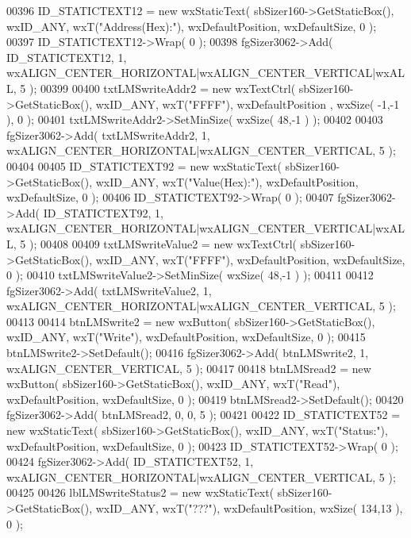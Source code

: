 \begin{DoxyCode}
00396     ID_STATICTEXT12 = \textcolor{keyword}{new} wxStaticText( sbSizer160->GetStaticBox(), wxID\_ANY, wxT(\textcolor{stringliteral}{"Address(Hex):"}), 
      wxDefaultPosition, wxDefaultSize, 0 );
00397     ID_STATICTEXT12->Wrap( 0 );
00398     fgSizer3062->Add( ID_STATICTEXT12, 1, wxALIGN\_CENTER\_HORIZONTAL|wxALIGN\_CENTER\_VERTICAL|wxALL, 5 );
00399     
00400     txtLMSwriteAddr2 = \textcolor{keyword}{new} wxTextCtrl( sbSizer160->GetStaticBox(), wxID\_ANY, wxT(\textcolor{stringliteral}{"FFFF"}), wxDefaultPosition
      , wxSize( -1,-1 ), 0 );
00401     txtLMSwriteAddr2->SetMinSize( wxSize( 48,-1 ) );
00402     
00403     fgSizer3062->Add( txtLMSwriteAddr2, 1, wxALIGN\_CENTER\_HORIZONTAL|wxALIGN\_CENTER\_VERTICAL, 5 );
00404     
00405     ID_STATICTEXT92 = \textcolor{keyword}{new} wxStaticText( sbSizer160->GetStaticBox(), wxID\_ANY, wxT(\textcolor{stringliteral}{"Value(Hex):"}), 
      wxDefaultPosition, wxDefaultSize, 0 );
00406     ID_STATICTEXT92->Wrap( 0 );
00407     fgSizer3062->Add( ID_STATICTEXT92, 1, wxALIGN\_CENTER\_HORIZONTAL|wxALIGN\_CENTER\_VERTICAL|wxALL, 5 );
00408     
00409     txtLMSwriteValue2 = \textcolor{keyword}{new} wxTextCtrl( sbSizer160->GetStaticBox(), wxID\_ANY, wxT(\textcolor{stringliteral}{"FFFF"}), 
      wxDefaultPosition, wxDefaultSize, 0 );
00410     txtLMSwriteValue2->SetMinSize( wxSize( 48,-1 ) );
00411     
00412     fgSizer3062->Add( txtLMSwriteValue2, 1, wxALIGN\_CENTER\_HORIZONTAL|wxALIGN\_CENTER\_VERTICAL, 5 );
00413     
00414     btnLMSwrite2 = \textcolor{keyword}{new} wxButton( sbSizer160->GetStaticBox(), wxID\_ANY, wxT(\textcolor{stringliteral}{"Write"}), wxDefaultPosition, 
      wxDefaultSize, 0 );
00415     btnLMSwrite2->SetDefault(); 
00416     fgSizer3062->Add( btnLMSwrite2, 1, wxALIGN\_CENTER\_VERTICAL, 5 );
00417     
00418     btnLMSread2 = \textcolor{keyword}{new} wxButton( sbSizer160->GetStaticBox(), wxID\_ANY, wxT(\textcolor{stringliteral}{"Read"}), wxDefaultPosition, 
      wxDefaultSize, 0 );
00419     btnLMSread2->SetDefault(); 
00420     fgSizer3062->Add( btnLMSread2, 0, 0, 5 );
00421     
00422     ID_STATICTEXT52 = \textcolor{keyword}{new} wxStaticText( sbSizer160->GetStaticBox(), wxID\_ANY, wxT(\textcolor{stringliteral}{"Status:"}), 
      wxDefaultPosition, wxDefaultSize, 0 );
00423     ID_STATICTEXT52->Wrap( 0 );
00424     fgSizer3062->Add( ID_STATICTEXT52, 1, wxALIGN\_CENTER\_HORIZONTAL|wxALIGN\_CENTER\_VERTICAL, 5 );
00425     
00426     lblLMSwriteStatus2 = \textcolor{keyword}{new} wxStaticText( sbSizer160->GetStaticBox(), wxID\_ANY, wxT(\textcolor{stringliteral}{"???"}), 
      wxDefaultPosition, wxSize( 134,13 ), 0 );

\end{DoxyCode}
